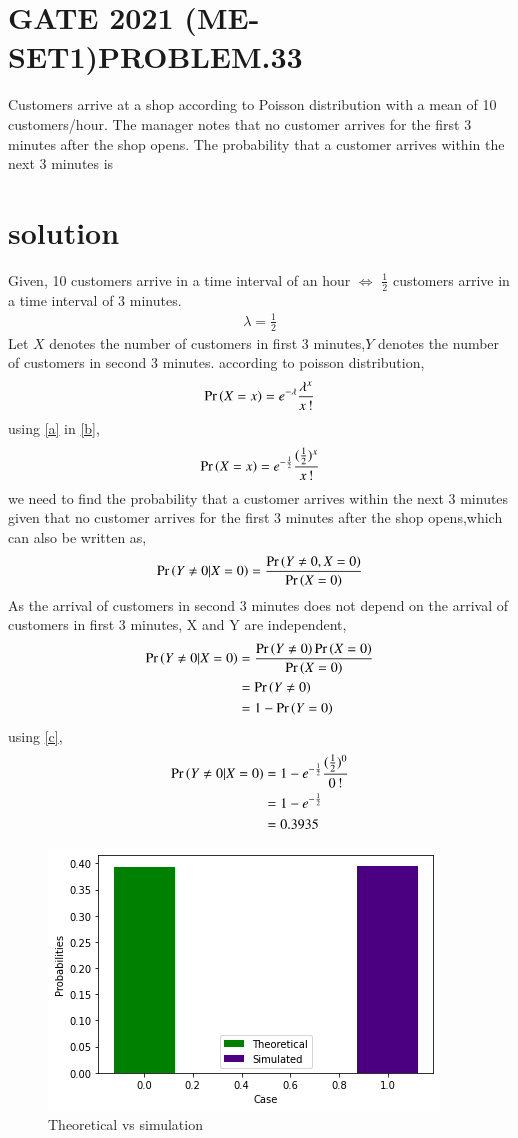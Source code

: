 \documentclass[journal,12pt,twocolumn]{IEEEtran}
\begin{document}
\section{GATE 2021 (ME-SET1)PROBLEM.33}
Customers arrive at a shop according to Poisson distribution with a mean of 10 customers/hour. The manager notes that no customer arrives for the first 3 minutes after the shop opens. The probability that a customer arrives within the next 3 minutes is
\section{solution}
Given, 
10 customers arrive in a time interval of an hour $\iff$ $\frac{1}{2}$ customers arrive in a time interval of 3 minutes.
\begin{align}
\lambda = \frac{1}{2} \label{a}
\end{align}
Let $X$ denotes the number of customers in first 3 minutes,$Y$ denotes the number of customers in second 3 minutes.
according to  poisson distribution,
\begin{align}
\Pr\left(X=x\right)= e^{-\lambda} \frac{\lambda^{x}}{x\,!} \label{b}
\end{align}
using \eqref{a} in \eqref{b},
\begin{align}
\Pr\left(X=x\right)= e^{-\frac{1}{2}} \frac{(\frac{1}{2})^{x}}{x\,!} \label{c}
\end{align}
we need to find the probability that a customer arrives within the next 3 minutes given that no customer arrives for the first 3 minutes after the shop opens,which can also be written as,
\begin{align}
\Pr\left(Y\neq 0|X=0\right)=\frac{\Pr\left(Y\neq 0,X=0\right)}{\Pr\left(X=0\right)}
\end{align}
As the arrival of customers in second 3 minutes does not depend on the arrival of customers in first 3 minutes, X and Y are independent,
\begin{align}
\Pr\left(Y\neq 0|X=0\right)&=\frac{\Pr\left(Y\neq 0\right)\Pr\left(X=0\right)}{\Pr\left(X=0\right)}\\
&=\Pr\left(Y\neq 0\right)\\
&= 1-\Pr\left(Y=0\right) 
\end{align}
using \eqref{c},
\begin{align}
\Pr\left(Y\neq 0|X=0\right)&=1- e^{-\frac{1}{2}} \frac{(\frac{1}{2})^{0}}{0\,!}\\
&=1- e^{-\frac{1}{2}}\\
&= 0.3935
\end{align}
\begin{figure}[ht]
    \centering
    \includegraphics[width=\columnwidth]{assign_9.png}
    \caption{Theoretical vs simulation}
\label{fig_1}
\end{figure}
\end{document}
